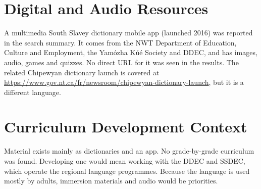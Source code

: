 \documentclass[12pt]{article}
\begin{document}
\section{Digital and Audio Resources}
A multimedia South Slavey dictionary mobile app (launched 2016) was reported in the search summary. It comes from the NWT Department of Education, Culture and Employment, the Yam\'ozha K\'u\'e Society and DDEC, and has images, audio, games and quizzes. No direct URL for it was seen in the results. The related Chipewyan dictionary launch is covered at \url{https://www.gov.nt.ca/fr/newsroom/chipewyan-dictionary-launch}, but it is a different language.

\section{Curriculum Development Context}
Material exists mainly as dictionaries and an app. No grade-by-grade curriculum was found. Developing one would mean working with the DDEC and SSDEC, which operate the regional language programmes. Because the language is used mostly by adults, immersion materials and audio would be priorities.
\end{document}
